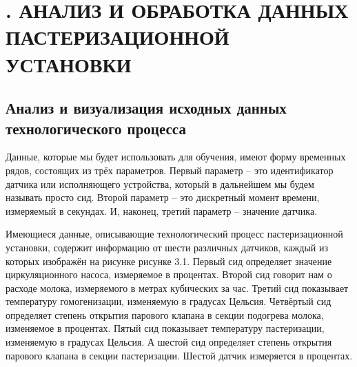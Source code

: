 \sectionbreak \section*{
  \cyrillicfont 
  \fontsize{14pt}{0pt}\selectfont
  \englishfont 
  . АНАЛИЗ И ОБРАБОТКА ДАННЫХ ПАСТЕРИЗАЦИОННОЙ УСТАНОВКИ
}

\titlespace
\subsection*{ 
  \cyrillicfont 
  \fontsize{14pt}{0pt}\selectfont
  \englishfont
   Анализ и визуализация исходных данных технологического процесса
} 
\titlespace

{\cyrillicfont 
\fontsize{13pt}{16.25pt}\selectfont 
\englishfont 

  \par \redline Данные, которые мы будет использовать для обучения, имеют форму временных рядов, состоящих из трёх параметров. Первый параметр – это идентификатор датчика или исполняющего устройства, который в дальнейшем мы будем называть просто сид. Второй параметр – это дискретный момент времени, измеряемый в секундах. И, наконец, третий параметр – значение датчика. 

  \par \redline Имеющиеся данные, описывающие технологический процесс пастеризационной установки, содержит информацию от шести различных датчиков, каждый из которых изображён на рисунке рисунке 3.1. Первый сид определяет значение циркуляционного насоса, измеряемое в процентах. Второй сид говорит нам о расходе молока, измеряемого в метрах кубических за час. Третий сид показывает температуру гомогенизации, изменяемую в градусах Цельсия. Четвёртый сид определяет степень открытия парового клапана в секции подогрева молока, изменяемое в процентах. Пятый сид показывает температуру пастеризации, изменяемую в градусах Цельсия. А шестой сид определяет степень открытия парового клапана в секции пастеризации. Шестой датчик измеряется в процентах.

}
